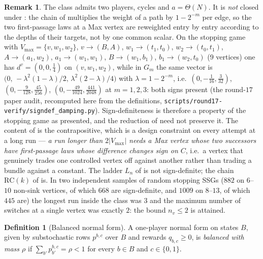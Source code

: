 \documentclass[11pt]{article}
\theoremstyle{plain}
\theoremstyle{definition}
\newtheorem{definition}[theorem]{Definition}
\newtheorem{remark}[theorem]{Remark}
\newcommand{\Vmax}{V_{\max}}
\begin{document}
\begin{remark}\label{rem:signdef}
The class admits two players, cycles and $a=\Theta(N)$. It is \emph{not}
closed under : the chain of  multiplies
the weight of a path by $1-2^{-m}$ per edge, so the two first-passage laws
at a Max vertex are reweighted entry by entry according to the depths of
their targets, not by one common scalar. On the stopping game with
$\Vmax=\{v,w_1,w_2\}$, $v\to(B,A)$, $w_1\to(t_1,t_0)$, $w_2\to(t_0,t_1)$,
$A\to(a_1,w_2)$, $a_1\to(w_1,w_1)$, $B\to(w_1,b_1)$, $b_1\to(w_2,t_0)$
($9$ vertices) one has $d^{v}=(0,0,\tfrac14)$ on $(v,w_1,w_2)$, while in
$G_m$ the same vector is
$\bigl(0,\,-\lambda^{2}(1-\lambda)/2,\,\lambda^{2}(2-\lambda)/4\bigr)$ with
$\lambda=1-2^{-m}$, i.e.\ $(0,-\tfrac1{16},\tfrac3{32})$,
$(0,-\tfrac9{128},\tfrac{45}{256})$, $(0,-\tfrac{49}{1024},\tfrac{441}{2048})$
at $m=1,2,3$: both signs present (the round-$17$ paper audit, recomputed
here from the definitions, \texttt{scripts/round17-verify/signdef\_damping.py}).
Sign-definiteness is therefore a property of the stopping game as
presented, and the reduction of  need not
preserve it. The content of  is the contrapositive,
which is a design constraint on every attempt at a long run --- \emph{a run longer than
$2|\Vmax|$ needs a Max vertex whose two successors have first-passage laws whose
difference changes sign on $C$}, i.e.\ a vertex that genuinely trades one controlled
vertex off against another rather than trading a bundle against a constant. The
ladder $L_n$ of  is not sign-definite; the chain $\mathrm{RC}(k)$ of
 is. In two independent samples of random stopping SSGs
($882$ on $6$--$10$ non-sink vertices, of which $668$ are sign-definite, and $1009$ on
$8$--$13$, of which $445$ are) the longest run inside the class was $3$ and the
maximum number of switches at a single vertex was exactly $2$: the bound $n_v\le2$ is
attained.
\end{remark}

\begin{definition}[Balanced normal form]\label{def:balanced}
A one-player normal form on states $B$, given by substochastic rows $p^{b,c}$ over
$B$ and rewards $q_{b,c}\ge0$, is \emph{balanced with mass $\rho$} if
$\sum_{b'}p^{b,c}_{b'}=\rho<1$ for every $b\in B$ and $c\in\{0,1\}$.
\end{definition}
\end{document}
